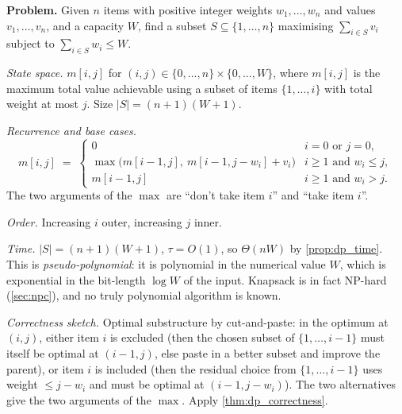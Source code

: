 \begin{example}[$0/1$ knapsack]
\label{ex:knapsack}
\textbf{Problem.} Given $n$ items with positive integer weights $w_1, \dots, w_n$ and values $v_1, \dots, v_n$, and a capacity $W$, find a subset $S \subseteq \{1, \dots, n\}$ maximising $\sum_{i \in S} v_i$ subject to $\sum_{i \in S} w_i \le W$.

\medskip
\noindent\textit{State space.} $m[i, j]$ for $(i, j) \in \{0, \dots, n\} \times \{0, \dots, W\}$, where $m[i, j]$ is the maximum total value achievable using a subset of items $\{1, \dots, i\}$ with total weight at most $j$. Size $|S| = (n+1)(W+1)$.

\medskip
\noindent\textit{Recurrence and base cases.}
\[
  m[i, j] \;=\; \begin{cases}
    0 & i = 0 \text{ or } j = 0, \\
    \max\bigl(m[i-1, j],\ m[i-1, j - w_i] + v_i\bigr) & i \ge 1 \text{ and } w_i \le j, \\
    m[i-1, j] & i \ge 1 \text{ and } w_i > j.
  \end{cases}
\]
The two arguments of the $\max$ are ``don't take item $i$'' and ``take item $i$''.

\medskip
\noindent\textit{Order.} Increasing $i$ outer, increasing $j$ inner.

\medskip
\noindent\textit{Time.} $|S| = (n+1)(W+1)$, $\tau = O(1)$, so $\Theta(nW)$ by \cref{prop:dp_time}. This is \emph{pseudo-polynomial}: it is polynomial in the numerical value $W$, which is exponential in the bit-length $\log W$ of the input. Knapsack is in fact NP-hard (\cref{sec:npc}), and no truly polynomial algorithm is known.

\medskip
\noindent\textit{Correctness sketch.} Optimal substructure by cut-and-paste: in the optimum at $(i, j)$, either item $i$ is excluded (then the chosen subset of $\{1, \dots, i-1\}$ must itself be optimal at $(i-1, j)$, else paste in a better subset and improve the parent), or item $i$ is included (then the residual choice from $\{1, \dots, i-1\}$ uses weight $\le j - w_i$ and must be optimal at $(i-1, j - w_i)$). The two alternatives give the two arguments of the $\max$. Apply \cref{thm:dp_correctness}.
\end{example}


